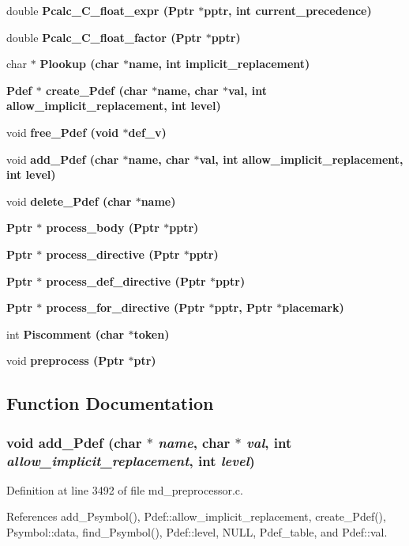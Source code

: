 \begin{CompactItemize}
double \bf{Pcalc\_\-C\_\-float\_\-expr} (\bf{Pptr} $\ast$pptr, int current\_\-precedence)
\item 
double \bf{Pcalc\_\-C\_\-float\_\-factor} (\bf{Pptr} $\ast$pptr)
\item 
char $\ast$ \bf{Plookup} (char $\ast$\bf{name}, int implicit\_\-replacement)
\item 
\bf{Pdef} $\ast$ \bf{create\_\-Pdef} (char $\ast$\bf{name}, char $\ast$val, int allow\_\-implicit\_\-replacement, int level)
\item 
void \bf{free\_\-Pdef} (void $\ast$def\_\-v)
\item 
void \bf{add\_\-Pdef} (char $\ast$\bf{name}, char $\ast$val, int allow\_\-implicit\_\-replacement, int level)
\item 
void \bf{delete\_\-Pdef} (char $\ast$\bf{name})
\item 
\bf{Pptr} $\ast$ \bf{process\_\-body} (\bf{Pptr} $\ast$pptr)
\item 
\bf{Pptr} $\ast$ \bf{process\_\-directive} (\bf{Pptr} $\ast$pptr)
\item 
\bf{Pptr} $\ast$ \bf{process\_\-def\_\-directive} (\bf{Pptr} $\ast$pptr)
\item 
\bf{Pptr} $\ast$ \bf{process\_\-for\_\-directive} (\bf{Pptr} $\ast$pptr, \bf{Pptr} $\ast$placemark)
\item 
int \bf{Piscomment} (char $\ast$token)
\item 
void \bf{preprocess} (\bf{Pptr} $\ast$ptr)
\end{CompactItemize}


\subsection{Function Documentation}
\subsubsection{\setlength{\rightskip}{0pt plus 5cm}void add\_\-Pdef (char $\ast$ {\em name}, char $\ast$ {\em val}, int {\em allow\_\-implicit\_\-replacement}, int {\em level})}\label{md__preprocessor_8h_a664d54fd7aa40b97a202097ac127738}




Definition at line 3492 of file md\_\-preprocessor.c.

References add\_\-Psymbol(), Pdef::allow\_\-implicit\_\-replacement, create\_\-Pdef(), Psymbol::data, find\_\-Psymbol(), Pdef::level, NULL, Pdef\_\-table, and Pdef::val.

